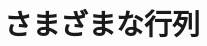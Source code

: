 \documentclass[../../topic_linear-algebra]{subfiles}
\begin{document}
\chapter{さまざまな行列}




\end{document}

